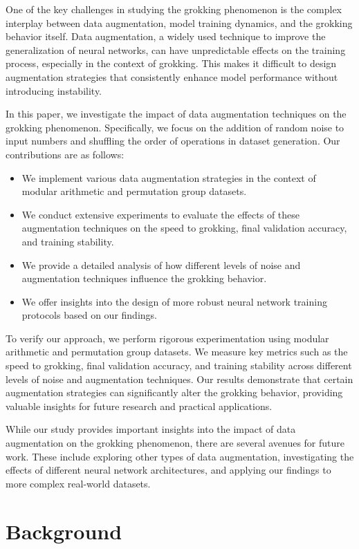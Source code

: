 \documentclass{article} %
\begin{document}
One of the key challenges in studying the grokking phenomenon is the complex interplay between data augmentation, model training dynamics, and the grokking behavior itself. Data augmentation, a widely used technique to improve the generalization of neural networks, can have unpredictable effects on the training process, especially in the context of grokking. This makes it difficult to design augmentation strategies that consistently enhance model performance without introducing instability.

In this paper, we investigate the impact of data augmentation techniques on the grokking phenomenon. Specifically, we focus on the addition of random noise to input numbers and shuffling the order of operations in dataset generation. Our contributions are as follows:
\begin{itemize}
    \item We implement various data augmentation strategies in the context of modular arithmetic and permutation group datasets.
    \item We conduct extensive experiments to evaluate the effects of these augmentation techniques on the speed to grokking, final validation accuracy, and training stability.
    \item We provide a detailed analysis of how different levels of noise and augmentation techniques influence the grokking behavior.
    \item We offer insights into the design of more robust neural network training protocols based on our findings.
\end{itemize}

To verify our approach, we perform rigorous experimentation using modular arithmetic and permutation group datasets. We measure key metrics such as the speed to grokking, final validation accuracy, and training stability across different levels of noise and augmentation techniques. Our results demonstrate that certain augmentation strategies can significantly alter the grokking behavior, providing valuable insights for future research and practical applications.

While our study provides important insights into the impact of data augmentation on the grokking phenomenon, there are several avenues for future work. These include exploring other types of data augmentation, investigating the effects of different neural network architectures, and applying our findings to more complex real-world datasets.


\section{Background}
\label{sec:background}
\end{document}
